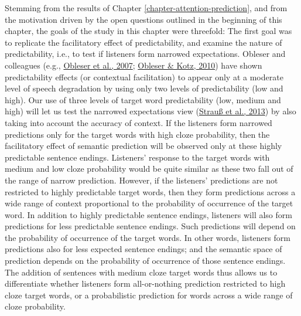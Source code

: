 \documentclass[a4paper, nobind]{templates/ociamthesis}
\begin{document}
\noindent
Stemming from the results of Chapter \ref{chapter-attention-prediction}, and from the motivation driven by the open questions outlined in the beginning of this chapter, the goals of the study in this chapter were threefold:
The first goal was to replicate the facilitatory effect of predictability, and examine the nature of predictability, i.e., to test if listeners form narrowed expectations.
Obleser and colleagues (e.g., \protect\hyperlink{ref-Obleser2007}{Obleser et al., 2007}; \protect\hyperlink{ref-Obleser2010}{Obleser \& Kotz, 2010}) have shown predictability effects (or contextual facilitation) to appear only at a moderate level of speech degradation by using only two levels of predictability (low and high).
Our use of three levels of target word predictability (low, medium and high) will let us test the narrowed expectations view (\protect\hyperlink{ref-Strauss2013}{Strauß et al., 2013}) by also taking into account the accuracy of context.
If the listeners form narrowed predictions only for the target words with high cloze probability, then the facilitatory effect of semantic prediction will be observed only at these highly predictable sentence endings.
Listeners' response to the target words with medium and low cloze probability would be quite similar as these two fall out of the range of narrow prediction.
However, if the listeners' predictions are not restricted to highly predictable target words, then they form predictions across a wide range of context proportional to the probability of occurrence of the target word.
In addition to highly predictable sentence endings, listeners will also form predictions for less predictable sentence endings.
Such predictions will depend on the probability of occurrence of the target words.
In other words, listeners form predictions also for less expected sentence endings;
and the semantic space of prediction depends on the probability of occurrence of those sentence endings.
The addition of sentences with medium cloze target words thus allows us to differentiate whether listeners form all-or-nothing prediction restricted to high cloze target words, or a probabilistic prediction for words across a wide range of cloze probability.
\end{document}
